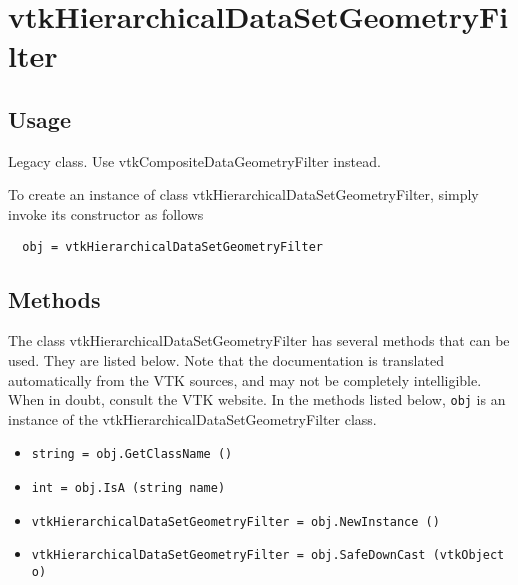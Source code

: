 \section{vtkHierarchicalDataSetGeometryFilter}

\subsection{Usage}

 Legacy class. Use vtkCompositeDataGeometryFilter instead.


To create an instance of class vtkHierarchicalDataSetGeometryFilter, simply
invoke its constructor as follows
\begin{verbatim}
  obj = vtkHierarchicalDataSetGeometryFilter
\end{verbatim}
\subsection{Methods}

The class vtkHierarchicalDataSetGeometryFilter has several methods that can be used.
  They are listed below.
Note that the documentation is translated automatically from the VTK sources,
and may not be completely intelligible.  When in doubt, consult the VTK website.
In the methods listed below, \verb|obj| is an instance of the vtkHierarchicalDataSetGeometryFilter class.
\begin{itemize}
\item  \verb|string = obj.GetClassName ()|

\item  \verb|int = obj.IsA (string name)|

\item  \verb|vtkHierarchicalDataSetGeometryFilter = obj.NewInstance ()|

\item  \verb|vtkHierarchicalDataSetGeometryFilter = obj.SafeDownCast (vtkObject o)|

\end{itemize}
